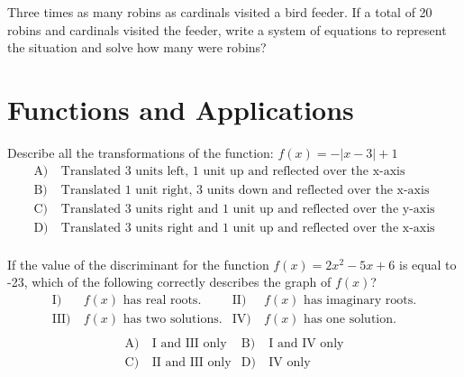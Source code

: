 \begin{problem}\label{Alg40}
Three times as many robins as cardinals visited a bird feeder.  If a total of 20 robins and cardinals
              visited the feeder, write a system of equations to represent the situation and solve how many were robins?

\end{problem}



\section*{Functions and Applications}

\begin{problem}\label{Alg2-2}
Describe all the transformations of the function: $f(x)=-|x-3|+1$
\begin{align*}
\text{A)}\ & \text{Translated 3 units left, 1 unit up and reflected over the x-axis} \\
\text{B)}\ &  \text{Translated 1 unit right, 3 units down and reflected over the x-axis}\\
\text{C)}\ &  \text{Translated 3 units right and 1 unit up and reflected over the y-axis}\\
\text{D)}\ & \text{Translated 3 units right and 1 unit up and reflected over the x-axis}\\
\end{align*}    
\end{problem}

\begin{problem}\label{Alg2-3}
If the value of the discriminant for the function $f(x)=2x^2-5x+6$ is equal to -23, which of the following correctly describes the graph of $f(x)$?
\begin{align*}
\text{I)}\ & f(x)\text{ has real roots.}&
\text{II)}\ & f(x) \text{ has imaginary roots.}  \\
\text{III)}\ & f(x) \text{ has two solutions.} &
\text{IV)}\ & f(x) \text{ has one solution.}\\
\end{align*}   
\begin{align*}
\text{A)}\ & \text{I and III only} &
\text{B)}\ & \text{I and IV only}\\
\text{C)}\ & \text{II and III only} &
\text{D)}\ & \text{IV only}\\
\end{align*}    
\end{problem}



